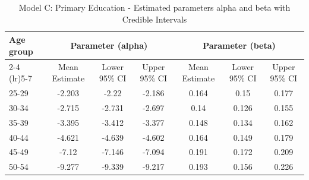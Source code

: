 \begin{landscape}
\begin{table}[htbp]
\centering
\caption{Model C: Primary Education - Estimated parameters alpha and beta  with Credible Intervals}
\label{tab:Fparameters_ab10}
\begin{tabular}{@{}lcccccc@{}}
\toprule
Age group & \multicolumn{3}{c}{Parameter (alpha)} & \multicolumn{3}{c}{Parameter (beta)} \\ 
\cmidrule(lr){2-4} \cmidrule(lr){5-7}
          & Mean Estimate & Lower 95\% CI & Upper 95\% CI & Mean Estimate & Lower 95\% CI & Upper 95\% CI \\ 
\midrule
25-29 & -2.203 & -2.22 & -2.186 & 0.164 & 0.15 & 0.177 \\
30-34 & -2.715 & -2.731 & -2.697 & 0.14 & 0.126 & 0.155 \\
35-39 & -3.395 & -3.412 & -3.377 & 0.148 & 0.134 & 0.162 \\
40-44 & -4.621 & -4.639 & -4.602 & 0.164 & 0.149 & 0.179 \\
45-49 & -7.12 & -7.146 & -7.094 & 0.191 & 0.172 & 0.209 \\
50-54 & -9.277 & -9.339 & -9.217 & 0.193 & 0.156 & 0.226 \\
\bottomrule
\end{tabular}
\end{table}
\end{landscape}